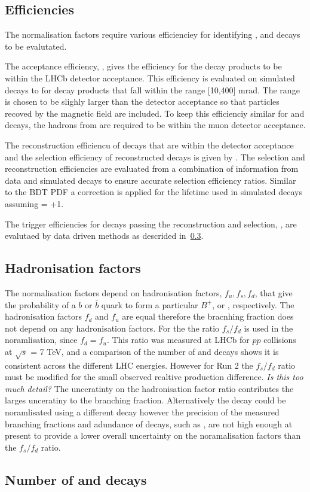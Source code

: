 \subsection{Efficiencies}
The normalisation factors require various efficienciey for identifying \bmumu, \bdkpi and \bujpsik decays to be evalutated. %

The acceptance efficiency, , gives the efficiency for the decay products to be within the LHCb detector acceptance. This efficiency is evaluated on simulated decays to for decay products that fall within the range [10,400] mrad. The range is chosen to be slighly larger than the detector acceptance so that particles recoved by the magnetic field are included. To keep this efficienciy similar for \bmumu and \bdkpi decays, the hadrons from \bdkpi are required to be within the muon detector acceptance. 

The reconstruction efficiencu of decays that are within the detector acceptance and the selection efficiency of reconstructed decays is given by . The selection and reconstruction efficiencies are evaluated from a combination of information from data and simulated decays to ensure accurate selection efficiency ratios. Similar to the BDT PDF a correction is applied for the lifetime used in simulated \bsmumu decays assuming \ADG = +1. 

The trigger efficiencies for decays passing the reconstruction and selection, , are evalutaed by data driven methods as descrided in~\ref{}. 


\subsection{Hadronisation factors}

The normalisation factors depend on hadronisation factors, $f_{u}, f_{s}, f_{d}$, that give the probability of a $b$ or $\bar{b}$ quark to form a particular $B^{+}$, \bs or \bd, respectively. The hadronisation factors $f_{d}$ and $f_{u}$ are equal therefore the \bmumu bracnhing fraction does not depend on any hadronisation factors. For the \bsmumu the ratio $f_{s}/f_{d}$ is used in the noramlisation, since $f_{d} = f_{u}$. This ratio was measured at LHCb for $pp$ collisions at $\sqrt{s}$ = 7 TeV, and a comparison of the number of \bujpsik and \bsjpisphi decays shows it is consistent across the different LHC energies. However for Run 2 the $f_{s}/f_{d}$ ratio must be modified for the small observed realtive production difference. {\it Is this too much detail?}
The unceratinty on the hadronisation factor ratio contributes the larges unceratiny to the \bsmumu branching fraction. Alternatively the \bsmumu decay could be noramlisated using a different \bs decay however the precision of the measured branching fractions and adundance of \bs decays, such as \bsjpsiphi, are not high enough at present to provide a lower overall uncertainty on the noramalisation factors than the $f_{s}/f_{d}$ ratio.

\subsection{Number of \bdkpi and \bujpsik decays}


